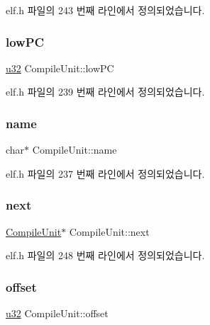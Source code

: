 elf.\+h 파일의 243 번째 라인에서 정의되었습니다.

\mbox{\label{struct_compile_unit_acd16e32e4b2af3a0ebca497e6bfb79aa}} 
\subsubsection{\texorpdfstring{low\+PC}{lowPC}}
{\footnotesize\ttfamily \mbox{\hyperlink{_system_8h_a10e94b422ef0c20dcdec20d31a1f5049}{u32}} Compile\+Unit\+::low\+PC}



elf.\+h 파일의 239 번째 라인에서 정의되었습니다.

\mbox{\label{struct_compile_unit_a56da363bb4b326b104c5d3e87a81ed6d}} 
\subsubsection{\texorpdfstring{name}{name}}
{\footnotesize\ttfamily char$\ast$ Compile\+Unit\+::name}



elf.\+h 파일의 237 번째 라인에서 정의되었습니다.

\mbox{\label{struct_compile_unit_ada8fe7f00de2bd5b1808782e1baecf5f}} 
\subsubsection{\texorpdfstring{next}{next}}
{\footnotesize\ttfamily \mbox{\hyperlink{struct_compile_unit}{Compile\+Unit}}$\ast$ Compile\+Unit\+::next}



elf.\+h 파일의 248 번째 라인에서 정의되었습니다.

\mbox{\label{struct_compile_unit_a25babc3939d9beaf5f9fb713b06d7ff0}} 
\subsubsection{\texorpdfstring{offset}{offset}}
{\footnotesize\ttfamily \mbox{\hyperlink{_system_8h_a10e94b422ef0c20dcdec20d31a1f5049}{u32}} Compile\+Unit\+::offset}



